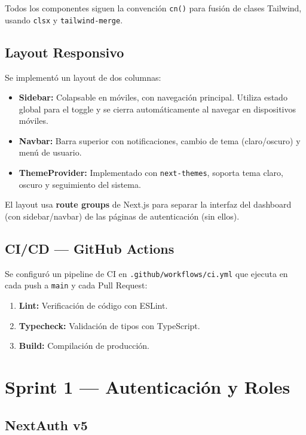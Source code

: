 \documentclass[12pt,a4paper]{article}
\begin{document}
Todos los componentes siguen la convención \texttt{cn()} para fusión de clases
Tailwind, usando \texttt{clsx} y \texttt{tailwind-merge}.

\subsection{Layout Responsivo}

Se implementó un layout de dos columnas:

\begin{itemize}[leftmargin=*]
    \item \textbf{Sidebar:} Colapsable en móviles, con navegación principal.
          Utiliza estado global para el toggle y se cierra automáticamente al
          navegar en dispositivos móviles.
    \item \textbf{Navbar:} Barra superior con notificaciones, cambio de tema
          (claro/oscuro) y menú de usuario.
    \item \textbf{ThemeProvider:} Implementado con \texttt{next-themes}, soporta
          tema claro, oscuro y seguimiento del sistema.
\end{itemize}

El layout usa \textbf{route groups} de Next.js para separar la interfaz del
dashboard (con sidebar/navbar) de las páginas de autenticación (sin ellos).

\subsection{CI/CD — GitHub Actions}

Se configuró un pipeline de CI en \texttt{.github/workflows/ci.yml} que ejecuta
en cada push a \texttt{main} y cada Pull Request:

\begin{enumerate}[leftmargin=*]
    \item \textbf{Lint:} Verificación de código con ESLint.
    \item \textbf{Typecheck:} Validación de tipos con TypeScript.
    \item \textbf{Build:} Compilación de producción.
\end{enumerate}

\section{Sprint 1 — Autenticación y Roles}

\subsection{NextAuth v5}
\end{document}
